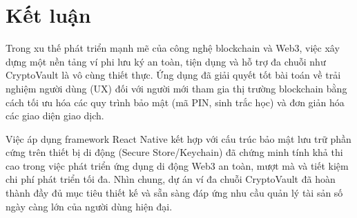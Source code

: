 \documentclass[a4paper]{report}
\begin{document}
\section{Kết luận}

Trong xu thế phát triển mạnh mẽ của công nghệ blockchain và Web3, việc xây dựng một nền tảng ví phi lưu ký an toàn, tiện dụng và hỗ trợ đa chuỗi như CryptoVault là vô cùng thiết thực. Ứng dụng đã giải quyết tốt bài toán về trải nghiệm người dùng (UX) đối với người mới tham gia thị trường blockchain bằng cách tối ưu hóa các quy trình bảo mật (mã PIN, sinh trắc học) và đơn giản hóa các giao diện giao dịch.

\medskip

Việc áp dụng framework React Native kết hợp với cấu trúc bảo mật lưu trữ phần cứng trên thiết bị di động (Secure Store/Keychain) đã chứng minh tính khả thi cao trong việc phát triển ứng dụng di động Web3 an toàn, mượt mà và tiết kiệm chi phí phát triển tối đa. Nhìn chung, dự án ví đa chuỗi CryptoVault đã hoàn thành đầy đủ mục tiêu thiết kế và sẵn sàng đáp ứng nhu cầu quản lý tài sản số ngày càng lớn của người dùng hiện đại.
\end{document}
